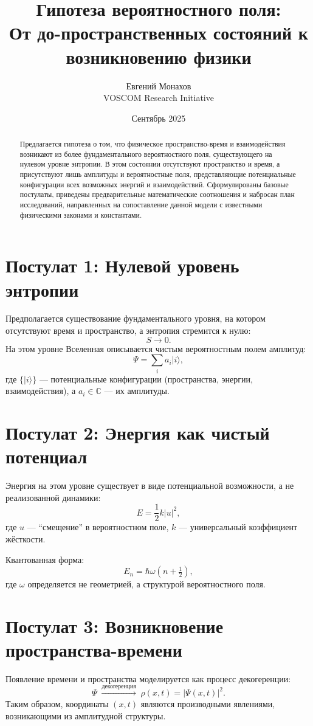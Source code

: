 \documentclass[12pt,a4paper]{article}
\title{Гипотеза вероятностного поля:\\
От до-пространственных состояний к возникновению физики}
\author{Евгений Монахов \\ VOSCOM Research Initiative}
\date{Сентябрь 2025}
\begin{document}
\maketitle

\begin{abstract}
Предлагается гипотеза о том, что физическое пространство-время и взаимодействия возникают из более фундаментального вероятностного поля, существующего на нулевом уровне энтропии. В этом состоянии отсутствуют пространство и время, а присутствуют лишь амплитуды и вероятностные поля, представляющие потенциальные конфигурации всех возможных энергий и взаимодействий. Сформулированы базовые постулаты, приведены предварительные математические соотношения и набросан план исследований, направленных на сопоставление данной модели с известными физическими законами и константами.
\end{abstract}

\section{Постулат 1: Нулевой уровень энтропии}
Предполагается существование фундаментального уровня, на котором отсутствуют время и пространство, а энтропия стремится к нулю:
\[
S \to 0.
\]
На этом уровне Вселенная описывается чистым вероятностным полем амплитуд:
\[
\Psi = \sum_{i} a_i |i\rangle ,
\]
где $\{|i\rangle\}$ — потенциальные конфигурации (пространства, энергии, взаимодействия), а $a_i \in \mathbb{C}$ — их амплитуды.

\section{Постулат 2: Энергия как чистый потенциал}
Энергия на этом уровне существует в виде потенциальной возможности, а не реализованной динамики:
\[
E = \frac{1}{2}k |u|^2 ,
\]
где $u$ — ``смещение'' в вероятностном поле, $k$ — универсальный коэффициент жёсткости.

Квантованная форма:
\[
E_n = \hbar \omega \left(n + \tfrac{1}{2}\right),
\]
где $\omega$ определяется не геометрией, а структурой вероятностного поля.

\section{Постулат 3: Возникновение пространства-времени}
Появление времени и пространства моделируется как процесс декогеренции:
\[
\Psi \;\xrightarrow{\text{декогеренция}}\; \rho(x,t) = |\Psi(x,t)|^2 .
\]
Таким образом, координаты $(x,t)$ являются производными явлениями, возникающими из амплитудной структуры.
\end{document}
